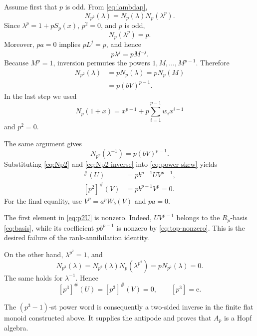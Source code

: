 \documentclass[11pt]{amsart}
\theoremstyle{definition}
\theoremstyle{remark}
\newcommand{\unit}{\mathrm e}
\begin{document}
Assume first that \(p\) is odd.  From \eqref{eq:lambdap},
\[
 N_{p^2}(\lambda)=N_p(\lambda)N_p(\lambda^p).
\]
Since \(\lambda^p=1+pS_p(x)\), \(p^2=0\), and \(p\) is odd,
\begin{equation}\label{eq:Nplambdap}
 N_p(\lambda^p)=p.
\end{equation}
Moreover, \(pa=0\) implies \(pL^j=p\), and hence
\begin{equation}\label{eq:p-lambda}
 p\lambda^j=pM^{-j}.
\end{equation}
Because \(M^p=1\), inversion permutes the powers
\(1,M,\ldots,M^{p-1}\).  Therefore
\begin{align}
 N_{p^2}(\lambda)
 &=pN_p(\lambda)
 =pN_p(M)\nonumber\\
 &=p(bV)^{p-1}.
 \label{eq:Np2}
\end{align}
In the last step we used
\[
 N_p(1+x)=x^{p-1}
 +p\sum_{i=1}^{p-1}w_i x^{i-1}
\]
and \(p^2=0\).

The same argument gives
\begin{equation}\label{eq:Np2-inverse}
 N_{p^2}(\lambda^{-1})=p(bV)^{p-1}.
\end{equation}
Substituting \eqref{eq:Np2} and \eqref{eq:Np2-inverse} into
\eqref{eq:power-skew} yields
\begin{align}
 [p^2]^\#(U)&=p b^{p-1}UV^{p-1},\label{eq:p2U}\\
 [p^2]^\#(V)&=p b^{p-1}V^p=0.\label{eq:p2V}
\end{align}
For the final equality, use \(V^p=a^pW_b(V)\) and \(pa=0\).

The first element in \eqref{eq:p2U} is nonzero.  Indeed,
\(UV^{p-1}\) belongs to the \(R_p\)-basis \eqref{eq:basis}, while its
coefficient \(pb^{p-1}\) is nonzero by \eqref{eq:top-nonzero}.  This is
the desired failure of the rank-annihilation identity.

On the other hand, \(\lambda^{p^2}=1\), and
\begin{equation}\label{eq:Np3}
 N_{p^3}(\lambda)
 =N_{p^2}(\lambda)N_p(\lambda^{p^2})
 =pN_{p^2}(\lambda)=0.
\end{equation}
The same holds for \(\lambda^{-1}\).  Hence
\begin{equation}\label{eq:p3zero}
 [p^3]^\#(U)=[p^3]^\#(V)=0,
 \qquad [p^3]=\unit.
\end{equation}

The \((p^3-1)\)-st power word is consequently a two-sided inverse in
the finite flat monoid constructed above.  It supplies the antipode and
proves that \(A_p\) is a Hopf algebra.
\end{document}
